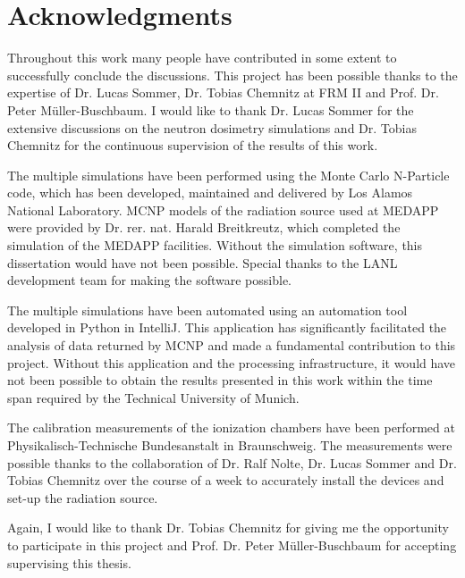 \chapter*{Acknowledgments}


Throughout this work many people have contributed in some extent to successfully conclude the discussions. This project has been possible thanks to the expertise of Dr. Lucas Sommer, Dr. Tobias Chemnitz at FRM II and Prof. Dr. Peter Müller-Buschbaum. I would like to thank Dr. Lucas Sommer for the extensive discussions on the neutron dosimetry simulations and Dr. Tobias Chemnitz for the continuous supervision of the results of this work.

The multiple simulations have been performed using the Monte Carlo N-Particle code, which has been developed, maintained and delivered by Los Alamos National Laboratory. MCNP models of the radiation source used at MEDAPP were provided by Dr. rer. nat. Harald Breitkreutz, which completed the simulation of the MEDAPP facilities. Without the simulation software, this dissertation would have not been possible. Special thanks to the LANL development team for making the software possible.

The multiple simulations have been automated using an automation tool developed in Python in IntelliJ. This application has significantly facilitated the analysis of data returned by MCNP and made a fundamental contribution to this project. Without this application and the processing infrastructure, it would have not been possible to obtain the results presented in this work within the time span required by the Technical University of Munich.

The calibration measurements of the ionization chambers have been performed at Physikalisch-Technische Bundesanstalt in Braunschweig. The measurements were possible thanks to the collaboration of Dr. Ralf Nolte, Dr. Lucas Sommer and Dr. Tobias Chemnitz over the course of a week to accurately install the devices and set-up the radiation source.

Again, I would like to thank Dr. Tobias Chemnitz for giving me the opportunity to participate in this project and Prof. Dr. Peter Müller-Buschbaum for accepting supervising this thesis. 


\cleardoublepage{}
